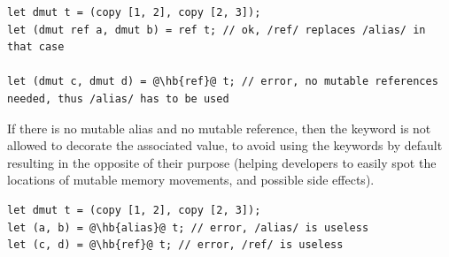 \begin{lstlisting}[style=coloredverbatimError, escapechar=@]
let dmut t = (copy [1, 2], copy [2, 3]);
let (dmut ref a, dmut b) = ref t; // ok, /ref/ replaces /alias/ in that case

let (dmut c, dmut d) = @\hb{ref}@ t; // error, no mutable references needed, thus /alias/ has to be used
\end{lstlisting}

If there is no mutable alias and no mutable reference, then the keyword is not
allowed to decorate the associated value, to avoid using the keywords by default
resulting in the opposite of their purpose (helping developers to easily spot
the locations of mutable memory movements, and possible side effects).

\begin{lstlisting}[style=coloredverbatimError, escapechar=@]
let dmut t = (copy [1, 2], copy [2, 3]);
let (a, b) = @\hb{alias}@ t; // error, /alias/ is useless
let (c, d) = @\hb{ref}@ t; // error, /ref/ is useless
\end{lstlisting}

\vfill%
\pagebreak
